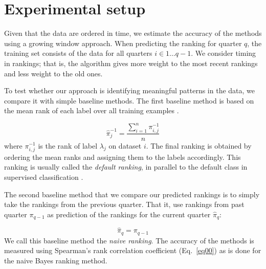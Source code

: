 \documentclass{article}\usepackage[]{graphicx}\usepackage[]{color}
\begin{document}
\section{Experimental setup}
\label{sec:exp_setup}



Given that the data are ordered in time, we estimate the accuracy of the methods using a growing window approach. When predicting the ranking for quarter $q$, the training set consists of the data for all quarters $i \in 1 \ldots q-1$. We consider timing in rankings; that is, the algorithm gives more weight to the most recent rankings and less weight to the old ones. 

To test whether our approach is identifying meaningful patterns in the data, we compare it with simple baseline methods. The first baseline method is based on the mean rank of each label over all training examples \citep{brazdil2009}.

\begin{equation}
\label{default.rank}
\hat{\pi}^{-1}_{j} = \frac{\sum_{i=1}^n \pi^{-1}_{i,j}}{n}
\end{equation}
where $\pi^{-1}_{i,j}$ is the rank of label $\lambda_j$ on dataset $i$. The final ranking is obtained by ordering the mean ranks and assigning them to the labels accordingly. This ranking is usually called the \emph{default ranking}, in parallel to the default class in supervised classification \citep{mitchell1997}.

The second baseline method that we compare our predicted rankings is to simply  take  the rankings from the previous quarter. That it, use rankings from past quarter $\pi_{q-1}$ as prediction of the rankings for  the current quarter $\hat{\pi}_q$:

\begin{equation}
\label{naive:ranking}
\hat{\pi}_q=\pi_{q-1}
\end{equation}
We call this baseline method the \emph{naive ranking}. The accuracy of the methods is measured using Spearman's rank correlation coefficient (Eq.~\ref{eq00}) as is done for the naive Bayes ranking method.
\end{document}
